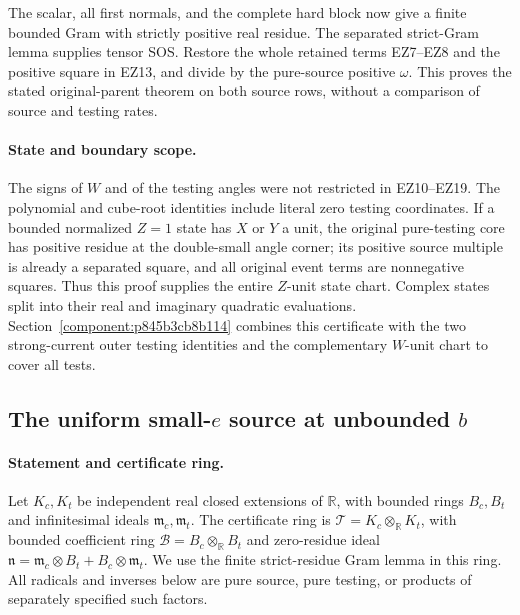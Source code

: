 The scalar, all first normals, and the complete hard block now
give a finite bounded Gram with strictly positive real residue.
The separated strict-Gram lemma supplies tensor SOS.
Restore the whole retained terms EZ7--EZ8 and the positive
square in EZ13, and divide by the pure-source positive $\omega$.
This proves the stated original-parent theorem on both source
rows, without a comparison of source and testing rates.

\paragraph{State and boundary scope.}
The signs of $W$ and of the testing angles were not restricted
in EZ10--EZ19. The polynomial and cube-root identities include
literal zero testing coordinates. If a bounded normalized
$Z=1$ state has $X$ or $Y$ a unit, the original pure-testing
core has positive residue at the double-small angle corner;
its positive source multiple is already a separated square,
and all original event terms are nonnegative squares.
Thus this proof supplies the entire $Z$-unit state chart.
Complex states split into their real and imaginary quadratic
evaluations. Section~\ref{component:p845b3cb8b114} combines this
certificate with the two strong-current outer testing identities
and the complementary $W$-unit chart to cover all tests.



\subsection{The uniform small-$e$ source at unbounded $b$}

\label{component:pabbcd0905dcd}

\label{pabbcd0905dcd:sec:c1-inverse-b-local-new}

\paragraph{Statement and certificate ring.}
Let $K_c,K_t$ be independent real closed extensions of $\mathbb R$,
with bounded rings $B_c,B_t$ and infinitesimal ideals
$\mathfrak m_c,\mathfrak m_t$. The certificate ring is
$\mathcal T=K_c\otimes_{\mathbb R}K_t$, with bounded coefficient ring
$\mathcal B=B_c\otimes_{\mathbb R}B_t$ and zero-residue ideal
$\mathfrak n=\mathfrak m_c\otimes B_t+B_c\otimes\mathfrak m_t$.
We use the finite strict-residue Gram lemma in this ring.
All radicals and inverses below are pure source, pure testing, or
products of separately specified such factors.

